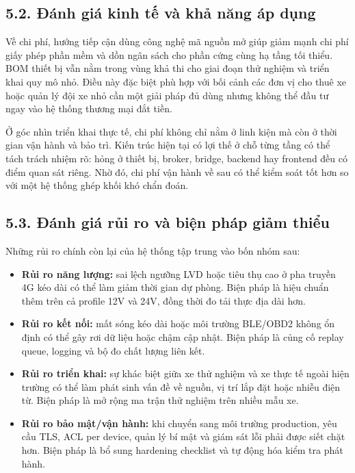 \documentclass[a4paper]{extarticle}
\providecommand{\tightlist}{%
  \setlength{\itemsep}{0pt}\setlength{\parskip}{0pt}}
\begin{document}
\subsection{5.2. Đánh giá kinh tế và khả năng áp dụng}

Về chi phí, hướng tiếp cận dùng công nghệ mã nguồn mở giúp giảm mạnh chi phí giấy phép phần mềm và dồn ngân sách cho phần cứng cùng hạ tầng tối thiểu. BOM thiết bị vẫn nằm trong vùng khả thi cho giai đoạn thử nghiệm và triển khai quy mô nhỏ. Điều này đặc biệt phù hợp với bối cảnh các đơn vị cho thuê xe hoặc quản lý đội xe nhỏ cần một giải pháp đủ dùng nhưng không thể đầu tư ngay vào hệ thống thương mại đắt tiền.

Ở góc nhìn triển khai thực tế, chi phí không chỉ nằm ở linh kiện mà còn ở thời gian vận hành và bảo trì. Kiến trúc hiện tại có lợi thế ở chỗ từng tầng có thể tách trách nhiệm rõ: hỏng ở thiết bị, broker, bridge, backend hay frontend đều có điểm quan sát riêng. Nhờ đó, chi phí vận hành về sau có thể kiểm soát tốt hơn so với một hệ thống ghép khối khó chẩn đoán.

\subsection{5.3. Đánh giá rủi ro và biện pháp giảm thiểu}

Những rủi ro chính còn lại của hệ thống tập trung vào bốn nhóm sau:

\begin{itemize}
\tightlist
\item
  \textbf{Rủi ro năng lượng:} sai lệch ngưỡng LVD hoặc tiêu thụ cao ở pha truyền 4G kéo dài có thể làm giảm thời gian dự phòng. Biện pháp là hiệu chuẩn thêm trên cả profile 12V và 24V, đồng thời đo tải thực địa dài hơn.
\item
  \textbf{Rủi ro kết nối:} mất sóng kéo dài hoặc môi trường BLE/OBD2 không ổn định có thể gây rơi dữ liệu hoặc chậm cập nhật. Biện pháp là củng cố replay queue, logging và bộ đo chất lượng liên kết.
\item
  \textbf{Rủi ro triển khai:} sự khác biệt giữa xe thử nghiệm và xe thực tế ngoài hiện trường có thể làm phát sinh vấn đề về nguồn, vị trí lắp đặt hoặc nhiễu điện từ. Biện pháp là mở rộng ma trận thử nghiệm trên nhiều mẫu xe.
\item
  \textbf{Rủi ro bảo mật/vận hành:} khi chuyển sang môi trường production, yêu cầu TLS, ACL per device, quản lý bí mật và giám sát lỗi phải được siết chặt hơn. Biện pháp là bổ sung hardening checklist và tự động hóa kiểm tra phát hành.
\end{itemize}
\end{document}
